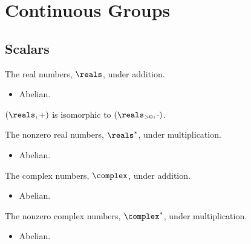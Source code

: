 \section{Continuous Groups}

\subsection{Scalars}

\begin{dfn}{}{}
    The real numbers, \(\reals\), under addition.
    
    \begin{multicols}{2}
        \begin{itemize}
            \item Abelian.
        \end{itemize}
    \end{multicols}
    \((\reals, +)\) is isomorphic to \((\reals_{>0}, \cdot)\).
\end{dfn}

\begin{dfn}{}{}
    The nonzero real numbers, \(\reals^*\), under multiplication.
    
    \begin{multicols}{2}
        \begin{itemize}
            \item Abelian.
        \end{itemize}
    \end{multicols}
\end{dfn}
    
\begin{dfn}{}{}
    The complex numbers, \(\complex\), under addition.
    
    \begin{multicols}{2}
        \begin{itemize}
            \item Abelian.
        \end{itemize}
    \end{multicols}
\end{dfn}

\begin{dfn}{}{}
    The nonzero complex numbers, \(\complex^*\), under multiplication.
    
    \begin{multicols}{2}
        \begin{itemize}
            \item Abelian.
        \end{itemize}
    \end{multicols}
\end{dfn}
    
